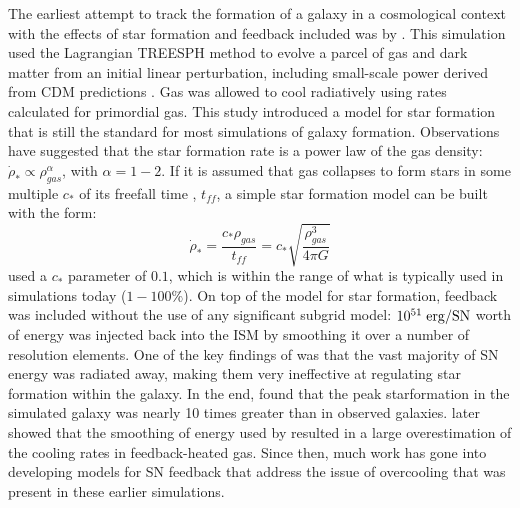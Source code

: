 The earliest attempt to track the formation of a galaxy in a cosmological
context with the effects of star formation and feedback included was by
\citet{Katz1992}.  This simulation used the Lagrangian TREESPH method
\citep{Hernquist1989} to evolve a parcel of gas and dark matter from an initial
linear perturbation, including small-scale power derived from CDM predictions
\citep{Zeldovich1970,Peebles1982}.
Gas was allowed to cool radiatively using rates calculated for primordial gas.
This study introduced a model for star formation that is still the standard for
most simulations of galaxy formation.  Observations \citep{Kennicutt1998} have
suggested that the star formation rate is a power law of the gas density:
$\dot\rho_*\propto\rho_{gas}^\alpha$, with $\alpha=1-2$.  If it is assumed that
gas collapses to form stars in some multiple $c_*$ of its freefall time
\citep{Schmidt1959},
$t_{ff}$, a simple star formation model can be built with the form:
\begin{equation}
    \dot\rho_* = \frac{c_*\rho_{gas}}{t_{ff}} = c_*\sqrt{\frac{\rho^3_{gas}}{4\pi G}}
\end{equation}
\citet{Katz1992} used a $c_*$ parameter of $0.1$, which is within the range of
what is typically used in simulations today ($1-100\%$).  On top of the model
for star formation, feedback was included without the use of any significant
subgrid model:  $10^{51}\;\rm{erg/SN}$ worth of energy was injected back into
the ISM by smoothing it over a number of resolution elements.  One of the key
findings of \citet{Katz1992} was that the vast majority of SN energy was
radiated away, making them very ineffective at regulating star formation within
the galaxy.  In the end, \citet{Katz1992} found that the peak starformation in
the simulated galaxy was nearly 10 times greater than in observed galaxies.
\citet{Thacker2000} later showed that the smoothing of energy used by
\citet{Katz1992} resulted in a large overestimation of the cooling rates in
feedback-heated gas. Since then, much work has gone into developing models for
SN feedback that address the issue of overcooling that was present in these
earlier simulations.

